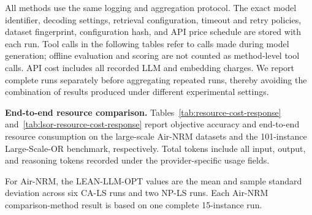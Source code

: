 \documentclass[11pt]{article}
\begin{document}
\begin{enumerate}[label=(AssoE.\arabic*),leftmargin=*]
\begin{enumerate}[label=(R2.Major.\arabic*),leftmargin=*]
All methods use the same logging and aggregation protocol. The exact model
identifier, decoding settings, retrieval configuration, timeout and retry
policies, dataset fingerprint, configuration hash, and API price schedule are
stored with each run. Tool calls in the following tables refer to calls made
during model generation; offline evaluation and scoring are not counted as
method-level tool calls. API cost includes all recorded LLM and embedding
charges. We report complete runs separately before aggregating repeated runs,
thereby avoiding the combination of results produced under different
experimental settings.

\medskip
\noindent\textbf{End-to-end resource comparison.}
Tables~\ref{tab:resource-cost-response}
and~\ref{tab:lsor-resource-cost-response} report objective accuracy and
end-to-end resource consumption on the large-scale Air-NRM datasets and the
101-instance Large-Scale-OR benchmark, respectively. Total tokens include all
input, output, and reasoning tokens recorded under the provider-specific usage
fields.

For Air-NRM, the LEAN-LLM-OPT values are the mean and sample standard
deviation across six CA-LS runs and two NP-LS runs. Each Air-NRM
comparison-method result is based on one complete 15-instance run.

\begin{table}[!htbp]
\centering
\caption{Per-run accuracy and resource consumption on large-scale Air-NRM.}
\label{tab:resource-cost-response}
\end{table}
\end{enumerate}
\end{enumerate}
\end{document}
